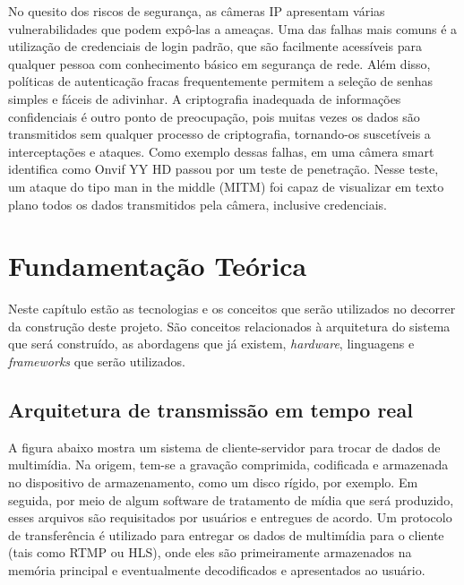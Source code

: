 \documentclass[12pt, %
openright, 
oneside, %
a4paper,    %
brazil]{facom-ufu-abntex2}
\begin{document}
No quesito dos riscos de segurança, as câmeras IP apresentam várias
vulnerabilidades que podem expô-las a ameaças. Uma das falhas mais comuns é a
utilização de credenciais de login padrão, que são facilmente acessíveis para
qualquer pessoa com conhecimento básico em segurança de rede. Além disso,
políticas de autenticação fracas frequentemente permitem a seleção de senhas
simples e fáceis de adivinhar. A criptografia inadequada de informações
confidenciais é outro ponto de preocupação, pois muitas vezes os dados são
transmitidos sem qualquer processo de criptografia, tornando-os suscetíveis a
interceptações e ataques. Como exemplo dessas falhas, em \cite{9116392} uma
câmera smart identifica como Onvif YY HD passou por um teste de penetração.
Nesse teste, um ataque do tipo man in the middle (MITM) foi capaz de visualizar
em texto plano todos os dados transmitidos pela câmera, inclusive credenciais.





\chapter{Fundamentação Teórica}

Neste capítulo estão as tecnologias e os conceitos que serão utilizados no
decorrer da construção deste projeto. São conceitos relacionados à arquitetura
do sistema que será construído, as abordagens que já existem, \emph{hardware},
linguagens e \emph{frameworks} que serão utilizados.

\section{Arquitetura de transmissão em tempo real}

A figura abaixo mostra um sistema de cliente-servidor para trocar de dados de
multimídia. Na origem, tem-se a gravação comprimida, codificada e armazenada no
dispositivo de armazenamento, como um disco rígido, por exemplo. Em seguida,
por meio de algum software de tratamento de mídia que será produzido, esses
arquivos são requisitados por usuários e entregues de acordo. Um protocolo de
transferência é utilizado para entregar os dados de multimídia para o cliente
(tais como RTMP ou HLS), onde eles são primeiramente armazenados na memória
principal e eventualmente decodificados e apresentados ao usuário.
\cite{lee2005scalable}
\end{document}
